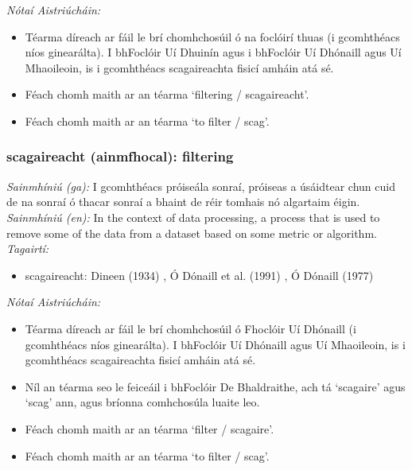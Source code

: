  \noindent \textit{Nótaí Aistriúcháin:}
\begin{itemize}
	\item Téarma díreach ar fáil le brí chomhchosúil ó na foclóirí thuas (i gcomhthéacs níos ginearálta). I bhFoclóir Uí Dhuinín agus i bhFoclóir Uí Dhónaill agus Uí Mhaoileoin, is i gcomhthéacs scagaireachta fisicí amháin atá sé.
	\item Féach chomh maith ar an téarma `filtering / scagaireacht'.
	\item Féach chomh maith ar an téarma `to filter / scag'.
\end{itemize}


\subsubsection*{scagaireacht (ainmfhocal): filtering}
 \noindent \textit{Sainmhíniú (ga):} I gcomhthéacs próiseála sonraí, próiseas a úsáidtear chun cuid de na sonraí ó thacar sonraí a bhaint de réir tomhais nó algartaim éigin.
\\
 \noindent \textit{Sainmhíniú (en):} In the context of data processing, a process that is used to remove some of the data from a dataset based on some metric or algorithm.
\\
 \noindent \textit{Tagairtí:}
\begin{itemize}
	\item scagaireacht: Dineen (1934) \cite{dineen}, Ó Dónaill et al. (1991) \cite{focloir-beag}, Ó Dónaill (1977) \cite{odonaill}
\end{itemize}

 \noindent \textit{Nótaí Aistriúcháin:}
\begin{itemize}
	\item Téarma díreach ar fáil le brí chomhchosúil ó Fhoclóir Uí Dhónaill (i gcomhthéacs níos ginearálta). I bhFoclóir Uí Dhónaill agus Uí Mhaoileoin, is i gcomhthéacs scagaireachta fisicí amháin atá sé.
	\item Níl an téarma seo le feiceáil i bhFoclóir De Bhaldraithe, ach tá `scagaire' agus `scag' ann, agus bríonna comhchosúla luaite leo.
	\item Féach chomh maith ar an téarma `filter / scagaire'.
	\item Féach chomh maith ar an téarma `to filter / scag'.
\end{itemize}


